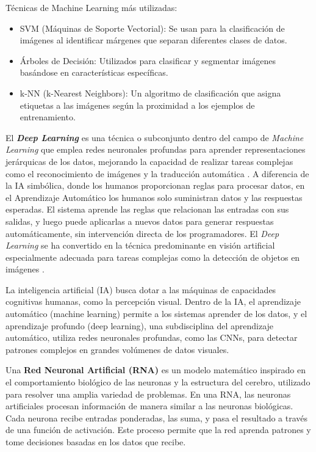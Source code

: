 Técnicas de Machine Learning más utilizadas: 
\begin{itemize}
    \item SVM (Máquinas de Soporte Vectorial): Se usan para la clasificación de imágenes al identificar márgenes que separan diferentes clases de datos.
    \item Árboles de Decisión: Utilizados para clasificar y segmentar imágenes basándose en características específicas.
    \item k-NN (k-Nearest Neighbors): Un algoritmo de clasificación que asigna etiquetas a las imágenes según la proximidad a los ejemplos de entrenamiento.
\end{itemize}


El \textbf{\textit{Deep Learning}} es una técnica o subconjunto dentro del campo de \textit{Machine Learning} que emplea redes neuronales profundas para aprender representaciones jerárquicas de los datos, mejorando la capacidad de realizar tareas complejas como el reconocimiento de imágenes y la traducción automática \cite{avila2020plant}.
A diferencia de la IA simbólica, donde los humanos proporcionan reglas para procesar datos, en el Aprendizaje Automático los humanos solo suministran datos y las respuestas esperadas. El sistema aprende las reglas que relacionan las entradas con sus salidas, y luego puede aplicarlas a nuevos datos para generar respuestas automáticamente, sin intervención directa de los programadores. El \textit{Deep Learning} se ha convertido en la técnica predominante en visión artificial especialmente adecuada para tareas complejas como la detección de objetos en imágenes \cite{Goodfellow-et-al-2016}\cite{centeno2019deep}.

La inteligencia artificial (IA) busca dotar a las máquinas de capacidades cognitivas humanas, como la percepción visual. Dentro de la IA, el aprendizaje automático (machine learning) permite a los sistemas aprender de los datos, y el aprendizaje profundo (deep learning), una subdisciplina del aprendizaje automático, utiliza redes neuronales profundas, como las CNNs, para detectar patrones complejos en grandes volúmenes de datos visuales.

Una \textbf{Red Neuronal Artificial (RNA)} es un modelo matemático inspirado en el comportamiento biológico de las neuronas y la estructura del cerebro, utilizado para resolver una amplia variedad de problemas. En una RNA, las neuronas artificiales procesan información de manera similar a las neuronas biológicas. Cada neurona recibe entradas ponderadas, las suma, y pasa el resultado a través de una función de activación. Este proceso permite que la red aprenda patrones y tome decisiones basadas en los datos que recibe\cite{centeno2019deep}.

